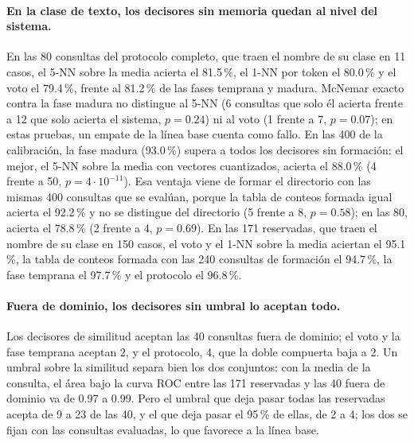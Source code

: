 \paragraph{En la clase de texto, los decisores sin memoria quedan al nivel del sistema.}
En las 80 consultas del protocolo completo, que traen el nombre de su clase en 11 casos,
el 5-NN sobre la media acierta el 81.5\,\%, el 1-NN por token el 80.0\,\% y el voto el
79.4\,\%, frente al 81.2\,\% de las fases temprana y madura.
McNemar exacto contra la fase madura no distingue al 5-NN (6 consultas que solo él
acierta frente a 12 que solo acierta el sistema, $p = 0.24$) ni al voto (1 frente a 7,
$p = 0.07$); en estas pruebas, un empate de la línea base cuenta como fallo.
En las 400 de la calibración, la fase madura (93.0\,\%) supera a todos los decisores
sin formación: el mejor, el 5-NN sobre la media con vectores cuantizados, acierta el
88.0\,\% (4 frente a 50, $p = 4 \cdot 10^{-11}$).
Esa ventaja viene de formar el directorio con las mismas 400 consultas que se evalúan,
porque la tabla de conteos formada igual acierta el 92.2\,\% y no se distingue del
directorio (5 frente a 8, $p = 0.58$); en las 80, acierta el 78.8\,\% (2 frente a 4,
$p = 0.69$).
En las 171 reservadas, que traen el nombre de su clase en 150 casos, el voto y el 1-NN
sobre la media aciertan el 95.1\,\%, la tabla de conteos formada con las 240 consultas
de formación el 94.7\,\%, la fase temprana el 97.7\,\% y el protocolo el 96.8\,\%.

\paragraph{Fuera de dominio, los decisores sin umbral lo aceptan todo.}
Los decisores de similitud aceptan las 40 consultas fuera de dominio; el voto y la fase
temprana aceptan 2, y el protocolo, 4, que la doble compuerta baja a 2.
Un umbral sobre la similitud separa bien los dos conjuntos: con la media de la consulta,
el área bajo la curva ROC entre las 171 reservadas y las 40 fuera de dominio va de 0.97
a 0.99.
Pero el umbral que deja pasar todas las reservadas acepta de 9 a 23 de las 40, y el que
deja pasar el 95\,\% de ellas, de 2 a 4; los dos se fijan con las consultas evaluadas, lo
que favorece a la línea base.

